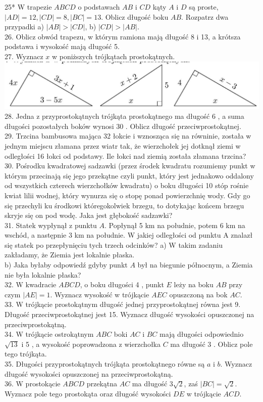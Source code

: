 \documentclass[10pt]{article}
\begin{document}
25* W trapezie \(A B C D\) o podstawach \(A B\) i \(C D\) kąty \(A\) i \(D\) są proste, \(|A D|=12,|C D|=8,|B C|=13\). Oblicz długość boku \(A B\). Rozpatrz dwa przypadki a) \(|A B|>|C D|\), b) \(|C D|>|A B|\).\\
26. Oblicz obwód trapezu, w którym ramiona mają długość 8 i 13, a krótsza podstawa i wysokość mają długość 5.\\
27. Wyznacz \(x\) w poniższych trójkątach prostokątnych.\\
\includegraphics[max width=\textwidth, center]{2024_11_21_71f62bd117d375398909g-127}\\
28. Jedna z przyprostokątnych trójkąta prostokątnego ma długość 6 , a suma długości pozostałych boków wynosi 30 . Oblicz długość przeciwprostokątnej.\\
29. Trzcina bambusowa mająca 32 łokcie i wznosząca się na równinie, została w jednym miejscu złamana przez wiatr tak, że wierzchołek jej dotknął ziemi w odległości 16 łokci od podstawy. Ile łokci nad ziemią została złamana trzcina?\\
30. Pośrodku kwadratowej sadzawki (przez środek kwadratu rozumiemy punkt w którym przecinają się jego przekątne czyli punkt, który jest jednakowo oddalony od wszystkich czterech wierzchołków kwadratu) o boku długości 10 stóp rośnie kwiat lilii wodnej, który wynurza się o stopę ponad powierzchnię wody. Gdy go się przechyli ku środkowi któregokolwiek brzegu, to dotykając końcem brzegu skryje się on pod wodę. Jaka jest głębokość sadzawki?\\
31. Statek wypłynął z punktu \(A\). Popłynął 5 km na południe, potem 6 km na wschód, a następnie 3 km na południe. W jakiej odległości od punktu A znalazł się statek po przepłynięciu tych trzech odcinków? a) W takim zadaniu zakładamy, że Ziemia jest lokalnie płaska.\\
b) Jaka byłaby odpowiedź gdyby punkt \(A\) był na biegunie północnym, a Ziemia nie była lokalnie płaska?\\
32. W kwadracie \(A B C D\), o boku długości 4 , punkt \(E\) leży na boku \(A B\) przy czym \(|A E|=1\). Wyznacz wysokość w trójkącie \(A E C\) opuszczoną na bok \(A C\).\\
33. W trójkącie prostokątnym długość jednej przyprostokątnej równa jest 9. Długość przeciwprostokątnej jest 15. Wyznacz długość wysokości opuszczonej na przeciwprostokątną.\\
34. W trójkącie ostrokątnym \(A B C\) boki \(A C\) i \(B C\) mają długości odpowiednio \(\sqrt{13}\) i 5 , a wysokość poprowadzona z wierzchołka \(C\) ma długość 3 . Oblicz pole tego trójkąta.\\
35. Długości przyprostokątnych trójkąta prostokątnego równe są \(a\) i \(b\). Wyznacz długość wysokości opuszczonej na przeciwprostokątną.\\
36. W prostokącie \(A B C D\) przekątna \(A C\) ma długość \(3 \sqrt{2}\), zaś \(|B C|=\sqrt{2}\). Wyznacz pole tego prostokąta oraz długość wysokości \(D E\) w trójkącie \(A C D\).
\end{document}
